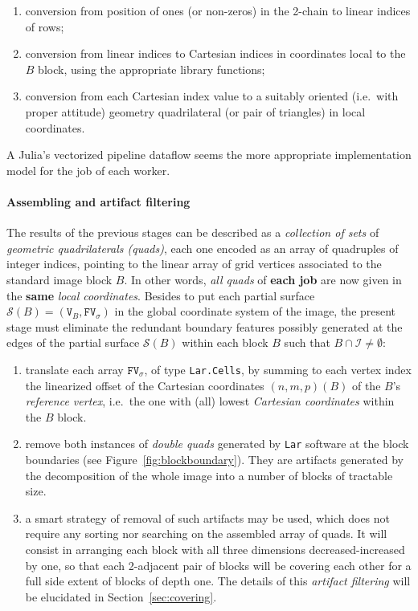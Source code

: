\begin{enumerate}

\item conversion from position of ones (or non-zeros) in the 2-chain to linear indices of rows;

\item conversion from linear indices to Cartesian indices in coordinates local to the $B$ block, using the appropriate library functions;

\item conversion from each Cartesian index value to a suitably oriented (i.e.~with proper attitude) geometry quadrilateral (or pair of triangles) in local coordinates.

\end{enumerate}

A Julia's vectorized pipeline dataflow seems the more appropriate implementation model for the job of each worker.

\paragraph{Assembling and artifact filtering} 
The results of the previous stages can be described as a \emph{collection of sets} of \emph{geometric quadrilaterals (quads)}, each one encoded as an array of quadruples of integer indices, pointing to the linear array of grid vertices associated to the standard image block $B$.  In other words, \emph{all quads} of \textbf{each job} are now given in the \textbf{same} \emph{local coordinates}.  Besides to put each partial surface $\mathcal{S}(B) = (\texttt{V}_B, \texttt{FV}_\sigma)$ in the global coordinate system of the image, the present stage must eliminate the redundant boundary features possibly generated at the edges of the partial surface $\mathcal{S}(B)$ within each block $B$ such that $B \cap \mathcal{I} \not= \emptyset$:
\begin{enumerate}

\item translate each array $\mathtt{FV}_\sigma$, of type \texttt{Lar.Cells}, by summing to each vertex index the linearized offset of the Cartesian coordinates $(n,m,p)(B)$ of the $B$'s \emph{reference vertex}, i.e.~the one with (all) lowest \emph{Cartesian coordinates} within the $B$ block.

\item remove both instances of \emph{double quads} generated by \texttt{Lar} software at the block boundaries (see Figure~\ref{fig:blockboundary}). They are artifacts generated by the decomposition of the whole image into a number of blocks of tractable size.

\item 
a smart strategy of removal of such artifacts may be used, which does not require any sorting nor searching on the assembled array of quads. It will consist in arranging each block with all three dimensions decreased-increased by one, so that each 2-adjacent pair of blocks will be covering each other for a full side extent of blocks of depth one. The details of this \emph{artifact filtering} will be elucidated in Section~\ref{sec:covering}.

\end{enumerate}

